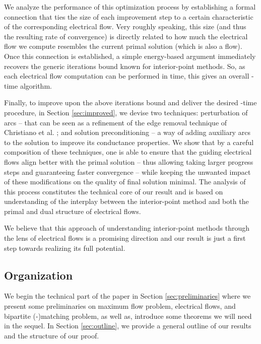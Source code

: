 \documentclass[11pt, letterpaper]{article}
\begin{document}
We analyze the performance of this optimization process by establishing a formal connection that ties the size of each improvement step to a certain characteristic of the corresponding electrical flow. Very roughly speaking, this size (and thus the resulting rate of convergence) is directly related to how much the electrical flow we compute resembles the current primal solution (which is also a flow). Once this connection is established, a simple energy-based argument immediately recovers the generic  iterations bound known for interior-point methods. So, as each electrical flow computation can be performed in  time, this gives an overall -time algorithm.  

Finally, to improve upon the above  iterations bound and deliver the desired -time procedure, in Section \ref{sec:improved}, we devise two techniques: perturbation of arcs -- that can be seen as a refinement of the edge removal technique of  Christiano et al. \cite{ChristianoKMST11}; and solution preconditioning -- a way of adding auxiliary arcs to the solution to improve its conductance properties. We show that by a careful composition of these techniques, one is able to ensure that the guiding electrical flows align better with the primal solution -- thus allowing taking larger progress steps and guaranteeing faster convergence -- while keeping the unwanted impact of these modifications on the quality of final solution minimal. The analysis of this process constitutes the technical core of our result and is based on understanding of the interplay between the interior-point method and both the primal and dual structure of electrical flows.

We believe that this approach of understanding interior-point methods through the lens of electrical flows is a promising direction and our result is just a first step towards realizing its full potential. 




\subsection{Organization}

We begin the technical part of the paper in Section \ref{sec:preliminaries} where we present some preliminaries on maximum flow problem, electrical flows, and bipartite (-)matching problem, as well as, introduce some theorems we will need in the sequel. In Section \ref{sec:outline}, we provide a general outline of our results and the structure of our proof. 
\end{document}

